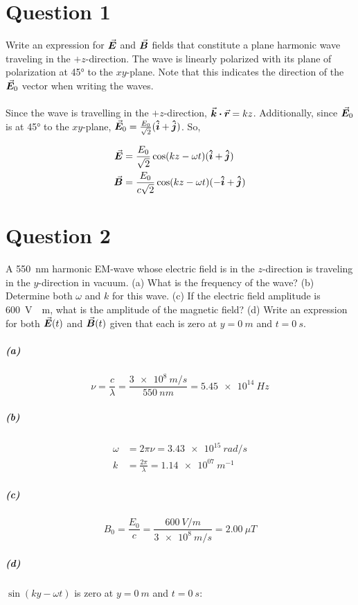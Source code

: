 \documentclass[a4paper]{article}
\begin{document}
\section*{Question 1}
Write an expression for $\va*{E}$ and $\va*{B}$ fields that constitute a plane harmonic wave traveling in the $+z$-direction. The wave is linearly polarized with its plane of polarization at \ang{45} to the $xy$-plane. Note that this indicates the direction of the $\va*{E}_0$ vector when writing the waves. \\\\

Since the wave is travelling in the $+z$-direction, $\va*{k} \vdot \va*{r} = kz$. Additionally, since $\va*{E}_0$ is at \ang{45} to the $xy$-plane, $\va*{E}_0 = \frac{E_0}{\sqrt{2}}(\vu*{i} + \vu*{j})$. So,

\begin{align*}
    \va*{E} &= \frac{E_0}{\sqrt{2}} \cos(kz - \omega t) (\vu*{i} + \vu*{j}) \\
    \va*{B} &= \frac{E_0}{c\sqrt{2}} \cos(kz - \omega t) (-\vu*{i} + \vu*{j})
\end{align*}

\section*{Question 2}
A \qty{550}{nm} harmonic EM-wave whose electric field is in the $z$-direction is traveling in the $y$-direction
in vacuum. (a) What is the frequency of the wave? (b) Determine both $\omega$ and $k$ for this wave. (c) If the
electric field amplitude is \qty{600}{V \per m}, what is the amplitude of the magnetic field? (d) Write an expression
for both $\va*{E}(t)$ and $\va*{B}(t)$ given that each is zero at $y = \qty{0}{m}$ and $t = \qty{0}{s}$. 

\subparagraph*{(a)}
\[
    \nu = \frac{c}{\lambda} = \frac{\qty{3e8}{m \per s}}{\qty{550}{nm}} = \qty{5.45e+14}{Hz}
\]

\subparagraph*{(b)}
\begin{align*}
    \omega &= 2 \pi \nu = \qty{3.43e+15}{rad \per s} \\
    k &= \frac{2 \pi}{\lambda} = \qty{1.14e+07}{m^{-1}}
\end{align*}

\subparagraph*{(c)}
\[
    B_0 = \frac{E_0}{c} = \frac{\qty{600}{V \per m}}{\qty{3e8}{m \per s}} = \qty{2.00}{\mu T}
\]

\subparagraph*{(d)}
$\sin(ky - \omega t)$ is zero at $y = \qty{0}{m}$ and $t = \qty{0}{s}$:
\end{document}
